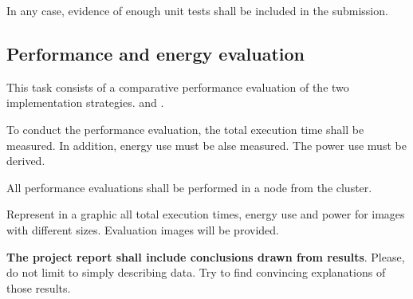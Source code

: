 In any case, evidence of enough unit tests shall be included in the
submission.


\subsection{Performance and energy evaluation}

This task consists of a comparative performance evaluation of the 
two implementation strategies.
 and .

To conduct the performance evaluation, the total execution time shall be measured.
In addition, energy use must be alse measured.
The power use must be derived.

All performance evaluations shall be performed in a node from the
 cluster.

Represent in a graphic all total execution times, energy use and power
for images with different sizes.
Evaluation images will be provided.

\textbf{The project report shall include conclusions drawn from results}.
Please, do not limit to simply describing data.
Try to find convincing explanations of those results.

